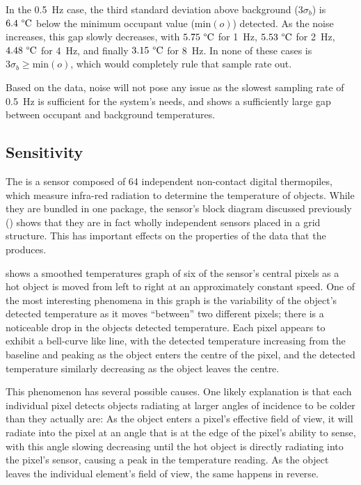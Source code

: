 \documentclass[../thesis/thesis.tex]{subfiles}
\begin{document}
In the 0.5~Hz case, the third standard deviation above background ($3\sigma_b$) is $6.4~\degree\textrm{C}$ below the minimum occupant value ($\mathrm{min}(o)$) detected. As the noise increases, this gap slowly decreases, with $5.75~\degree\textrm{C}$ for 1~Hz, $5.53~\degree\textrm{C}$ for 2~Hz, $4.48~\degree\textrm{C}$ for 4~Hz, and finally $3.15~\degree\textrm{C}$ for 8~Hz. In none of these cases is $3\sigma_b \ge \mathrm{min}(o)$, which would completely rule that sample rate out.

Based on the data, noise will not pose any issue as the slowest sampling rate of 0.5~Hz is sufficient for the system's needs, and shows a sufficiently large gap between occupant and background temperatures.

\subsection{Sensitivity}
\label{subsec:sensitivity}

The \mlx is a sensor composed of 64 independent non-contact digital thermopiles, which measure infra-red radiation to determine the temperature of objects. While they are bundled in one package, the sensor's block diagram discussed previously () shows that they are in fact wholly independent sensors placed in a grid structure. This has important effects on the properties of the data that the \mlx produces. 

 shows a smoothed temperatures graph of six of the sensor's central pixels as a hot object is moved from left to right at an approximately constant speed. One of the most interesting phenomena in this graph is the variability of the object's detected temperature as it moves ``between'' two different pixels; there is a noticeable drop in the objects detected temperature. Each pixel appears to exhibit a bell-curve like line, with the detected temperature increasing from the baseline and peaking as the object enters the centre of the pixel, and the detected temperature similarly decreasing as the object leaves the centre. 

This phenomenon has several possible causes. One likely explanation is that each individual pixel detects objects radiating at larger angles of incidence to be colder than they actually are: As the object enters a pixel's effective field of view, it will radiate into the pixel at an angle that is at the edge of the pixel's ability to sense, with this angle slowing decreasing until the hot object is directly radiating into the pixel's sensor, causing a peak in the temperature reading. As the object leaves the individual element's field of view, the same happens in reverse.
\end{document}
